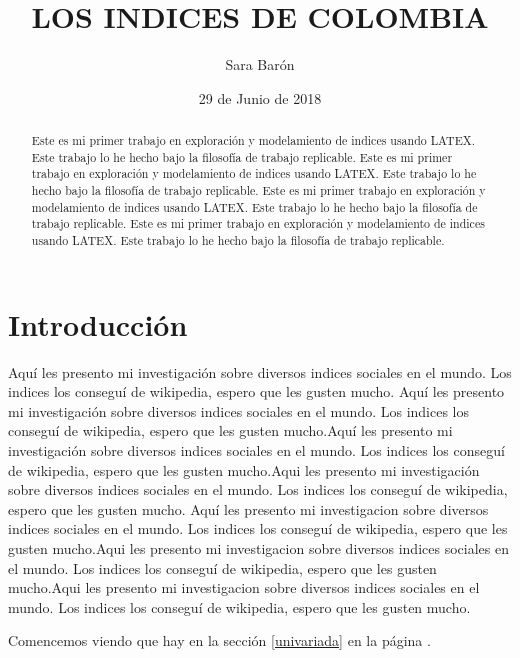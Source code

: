 \documentclass{article}
\title{LOS INDICES DE COLOMBIA}
\author[1]{\normalsize Sara Barón}
\affil[1]{\small  Escuela de Ingeniería,Universidad de los Andes\\
\texttt{{sj.baron10}@uniandes.edu.co}}
\date{29 de Junio de 2018}
\begin{document}

\maketitle


\begin{abstract}
Este es mi primer trabajo en exploración y modelamiento de indices usando LATEX. Este trabajo lo he hecho bajo la filosofía de trabajo replicable. Este es mi primer trabajo en exploración y modelamiento de indices usando LATEX. Este trabajo lo he hecho bajo la filosofía de trabajo replicable. Este es mi primer trabajo en exploración y modelamiento de indices usando LATEX. Este trabajo lo he hecho bajo la filosofía de trabajo replicable. Este es mi primer trabajo en exploración y modelamiento de indices usando LATEX. Este trabajo lo he hecho bajo la filosofía de trabajo replicable.
\end{abstract}

\section*{Introducción}

Aquí les presento mi investigación sobre diversos indices sociales en el mundo. Los indices los conseguí de wikipedia, espero que les gusten mucho. Aquí les presento mi investigación sobre diversos indices sociales en el mundo. Los indices los conseguí de wikipedia, espero que les gusten mucho.Aquí les presento mi investigación sobre diversos indices sociales en el mundo. Los indices los conseguí de wikipedia, espero que les gusten mucho.Aqui les presento mi investigación sobre diversos indices sociales en el mundo. Los indices los conseguí de wikipedia, espero que les gusten mucho.
Aquí les presento mi investigacion sobre diversos indices sociales en el mundo. Los indices los conseguí de wikipedia, espero que les gusten mucho.Aqui les presento mi investigacion sobre diversos indices sociales en el mundo. Los indices los conseguí de wikipedia, espero que les gusten mucho.Aqui les presento mi investigacion sobre diversos indices sociales en el mundo. Los indices los conseguí de wikipedia, espero que les gusten mucho.






Comencemos viendo que hay en la sección \ref{univariada} en la página \pageref{univariada}.

\clearpage
\end{document}
